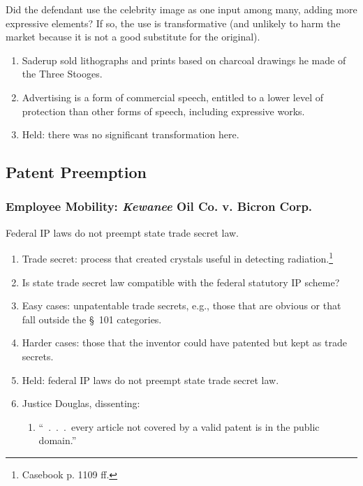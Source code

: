 Did the defendant use the celebrity image as one input among many, adding more 
expressive elements? If so, the use is transformative (and unlikely to harm 
the market because it is not a good substitute for the original).

\begin{enumerate}
    \item Saderup sold lithographs and prints based on charcoal drawings he 
    made of the Three Stooges.
    \item Advertising is a form of commercial speech, entitled to a lower 
    level of protection than other forms of speech, including expressive 
    works.
    \item Held: there was no significant transformation here.
\end{enumerate}

\subsection{Patent Preemption}

\subsubsection{Employee Mobility: \emph{Kewanee} Oil Co. v. Bicron Corp.}

Federal IP laws do not preempt state trade secret law.

\begin{enumerate}
    \item Trade secret: process that created crystals useful in detecting 
    radiation.\footnote{Casebook p. 1109 ff.}
    \item Is state trade secret law compatible with the federal statutory IP 
    scheme?
    \item Easy cases: unpatentable trade secrets, e.g., those that are obvious 
    or that fall outside the \S\ 101 categories.
    \item Harder cases: those that the inventor could have patented but kept 
    as trade secrets. 
    \item Held: federal IP laws do not preempt state trade secret law.
    \item Justice Douglas, dissenting:
    \begin{enumerate}
        \item ``~.~.~.~every article not covered by a valid patent is in the 
        public domain.''
    \end{enumerate}
\end{enumerate}

